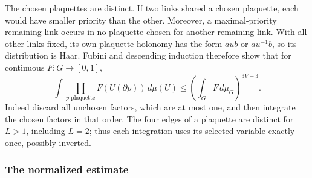 The chosen plaquettes are distinct. If two links shared a chosen
plaquette, each would have smaller priority than the other. Moreover,
a maximal-priority remaining link occurs in no plaquette chosen for
another remaining link. With all other links fixed, its own plaquette
holonomy has the form $aub$ or $au^{-1}b$, so its distribution is Haar.
Fubini and descending induction therefore show that for continuous
$F:G\to[0,1]$,
\begin{equation}\label{eq:rank-plaquette-elimination}
 \int \prod_{p\text{ plaquette}}F(U(\partial p))\,d\mu(U)
       \le\left(\int_GF\,d\mu_G\right)^{3V-3}.
\end{equation}
Indeed discard all unchosen factors, which are at most one, and then
integrate the chosen factors in that order. The four edges of a
plaquette are distinct for $L>1$, including $L=2$; thus each integration
uses its selected variable exactly once, possibly inverted.

\subsubsection{The normalized estimate}

